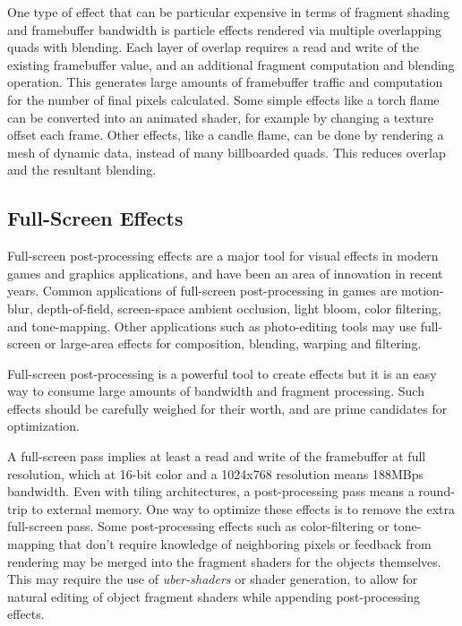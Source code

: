 One type of effect that can be particular expensive in terms of fragment
shading and framebuffer bandwidth is particle effects rendered via multiple
overlapping quads with blending.  Each layer of overlap requires a read and
write of the existing framebuffer value, and an additional fragment computation
and blending operation.  This generates large amounts of framebuffer traffic
and computation for the number of final pixels calculated.  Some simple effects
like a torch flame can be converted into an animated shader, for example by
changing a texture offset each frame.  Other effects, like a candle flame, can
be done by rendering a mesh of dynamic data, instead of many billboarded quads.  This
reduces overlap and the resultant blending.

\subsection {Full-Screen Effects}\label{Jon-McCaffrey-Full-Screen-Effects}
Full-screen post-processing effects are a major tool for visual effects in
modern games and graphics applications, and have been an area of innovation in
recent years.   Common applications of full-screen post-processing in games are
motion-blur, depth-of-field, screen-space ambient occlusion, light bloom, color
filtering, and tone-mapping.  Other applications such as photo-editing tools
may use full-screen or large-area effects for composition, blending, warping
and filtering.

Full-screen post-processing is a powerful tool to create effects but it is an
easy way to consume large amounts of bandwidth and fragment processing.  Such
effects should be carefully weighed for their worth, and are prime candidates
for optimization.  

A full-screen pass implies at least a read and write of the framebuffer at full
resolution, which at 16-bit color and a 1024x768 resolution means 188MBps
bandwidth.  Even with tiling architectures, a post-processing pass
means a round-trip to external memory.  One way to optimize these effects is to
remove the extra full-screen pass.  Some post-processing effects such as
color-filtering or tone-mapping that don't require knowledge of neighboring
pixels or feedback from rendering may be merged into the fragment shaders for
the objects themselves.  This may require the use of \textit{uber-shaders} or
shader generation, to allow for natural editing of object fragment shaders
while appending post-processing effects.

